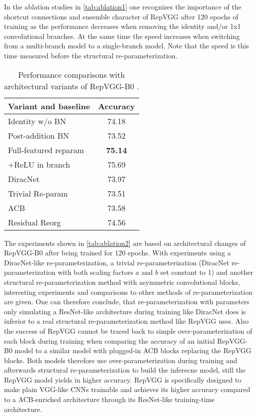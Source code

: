 In the ablation studies in \autoref{tab:ablation1} one recognizes the importance of the shortcut connections and ensemble character of RepVGG after 120 epochs of training as the performance decreases when removing the identity and/or 1x1 convolutional branches. At the same time the speed increases when switching from a multi-branch model to a single-branch model. Note that the speed is this time measured before the structural re-parameterization. 

\begin{table}
	\begin{center}
		\begin{tabular}{lc} 
			\hline
			Variant and baseline & Accuracy \\
			\hline
			Identity w/o BN & 74.18 \\
			Post-addition BN & 73.52 \\
			Full-featured reparam & \textbf{75.14} \\
			+ReLU in branch & 75.69 \\
			\hline
			DiracNet \cite{SergeyZagoruyko.2018} & 73.97 \\
			Trivial Re-param & 73.51 \\
			ACB \cite{XiaohanDing.2019} & 73.58 \\
			Residual Reorg & 74.56 \\
			\hline
		\end{tabular}
	\end{center}
	\caption{Performance comparisons with architectural variants of RepVGG-B0 \cite{XiaohanDing.2021}.}
	\label{tab:ablation2}
\end{table}

The experiments shown in \autoref{tab:ablation2} are based on architectural changes of RepVGG-B0 after being trained for 120 epochs. With experiments using a DiracNet-like re-parameterization, a trivial re-parameterization (DiracNet re-parameterization with both scaling factors $a$ and $b$ set constant to 1) and another structural re-parameterization method with asymmetric convolutional blocks, interesting experiments and comparisons to other methods of re-parameterization are given. One can therefore conclude, that re-parameterization with parameters only simulating a ResNet-like architecture during training like DiracNet does is inferior to a real structural re-parameterization method like RepVGG uses. Also the success of RepVGG cannot be traced back to simple over-parameterization of each block during training when comparing the accuracy of an initial RepVGG-B0 model to a similar model with plugged-in ACB blocks replacing the RepVGG blocks. Both models therefore use over-parameterization during training and afterwards structural re-parameterization to build the inferecne model, still the RepVGG model yields in higher accuracy. RepVGG is specifically designed to make plain VGG-like CNNs trainable and achieves its higher accuracy compared to a ACB-enriched architecture through its ResNet-like training-time architecture. 

